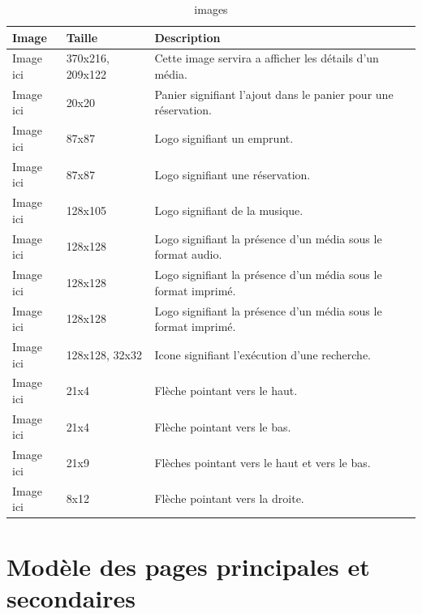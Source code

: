 \documentclass[letter, 10pt]{report}
\begin{document}
\begin{table}[h!]
	\caption{images}
	\begin{center}
		\begin{tabular}{|l|l|p{5cm}|}
		\hline
		Image 		& Taille 			& Description \\ \hline
		Image ici 	& 370x216, 209x122 	& Cette image servira a afficher les détails d'un média. \\ \hline
		Image ici 	& 20x20 			& Panier signifiant l'ajout dans le panier pour une réservation. \\ \hline
		Image ici 	& 87x87 			& Logo signifiant un emprunt. \\ \hline
		Image ici 	& 87x87 			& Logo signifiant une réservation. \\ \hline
		Image ici 	& 128x105 			& Logo signifiant de la musique. \\ \hline
		Image ici 	& 128x128 			& Logo signifiant la présence d'un média sous le format audio. \\ \hline
		Image ici 	& 128x128 			& Logo signifiant la présence d'un média sous le format imprimé. \\ \hline
		Image ici 	& 128x128 			& Logo signifiant la présence d'un média sous le format imprimé. \\ \hline
		Image ici 	& 128x128, 32x32 	& Icone signifiant l'exécution d'une recherche. \\ \hline
		Image ici 	& 21x4 				& Flèche pointant vers le haut. \\ \hline
		Image ici 	& 21x4 				& Flèche pointant vers le bas. \\ \hline
		Image ici 	& 21x9 				& Flèches pointant vers le haut et vers le bas. \\ \hline
		Image ici 	& 8x12 				& Flèche pointant vers la droite. \\ \hline
		\end{tabular}
	\end{center}
\end{table}

\section{Modèle des pages principales et secondaires}
\end{document}
